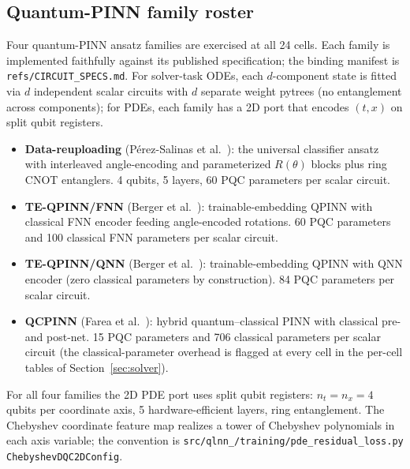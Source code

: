 \subsection{Quantum-PINN family roster}
\label{sec:methods-roster}

Four quantum-PINN ansatz families are exercised at all 24 cells.
Each family is implemented faithfully against its published
specification; the binding manifest is
\texttt{refs/CIRCUIT\_SPECS.md}. For solver-task ODEs, each $d$-component
state is fitted via $d$ independent scalar circuits with $d$
separate weight pytrees (no entanglement across components); for
PDEs, each family has a 2D port that encodes $(t, x)$ on split
qubit registers.

\begin{itemize}
  \item \textbf{Data-reuploading} (Pérez-Salinas et
        al.~\cite{perezsalinas2020dataru}): the universal
        classifier ansatz with interleaved angle-encoding and
        parameterized $R(\theta)$ blocks plus ring CNOT
        entanglers. 4 qubits, 5 layers, 60 PQC parameters per
        scalar circuit.
  \item \textbf{TE-QPINN/FNN} (Berger et
        al.~\cite{berger2025teqpinn}): trainable-embedding QPINN
        with classical FNN encoder feeding angle-encoded rotations.
        60 PQC parameters and 100 classical FNN parameters per
        scalar circuit.
  \item \textbf{TE-QPINN/QNN} (Berger et
        al.~\cite{berger2025teqpinn}): trainable-embedding QPINN
        with QNN encoder (zero classical parameters by
        construction). 84 PQC parameters per scalar circuit.
  \item \textbf{QCPINN} (Farea et
        al.~\cite{farea2025qcpinn}): hybrid quantum--classical
        PINN with classical pre- and post-net. 15 PQC parameters
        and 706 classical parameters per scalar circuit (the
        classical-parameter overhead is flagged at every cell in the
        per-cell tables of Section~\ref{sec:solver}).
\end{itemize}

For all four families the 2D PDE port uses split qubit registers:
$n_t = n_x = 4$ qubits per coordinate axis, 5 hardware-efficient
layers, ring entanglement. The Chebyshev coordinate feature map
realizes a tower of Chebyshev polynomials in each axis variable;
the convention is \texttt{src/qlnn\_/training/pde\_residual\_loss.py}
\texttt{ChebyshevDQC2DConfig}.

